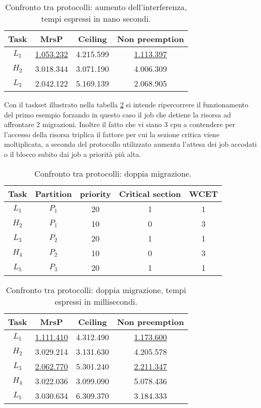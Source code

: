 \begin{table}
  \centering
  \begin{tabular}{cccc}
  \hline\hline
    Task & MrsP & Ceiling & Non preemption \\ \hline
    $L_1$ & \underline{1.053.232} & 4.215.599 & \underline{1.113.397} \\
    $H_2$ & 3.018.344 & 3.071.190 & 4.006.309 \\
    $L_3$ & 2.042.122 & 5.169.139 & 2.068.905 \\
    \hline
    \end{tabular}
    \caption{Confronto tra protocolli: aumento dell'interferenza, tempi espressi in nano secondi.}
  \label{tab:test_protocols_Taskset3_ris}
  \end{table}

\noindent Con il taskset illustrato nella tabella \ref{tab:test_protocols_Taskset4} si intende ripercorrere il funzionamento del primo esempio forzando in questo caso il job che detiene la risorsa ad affrontare 2 migrazioni. Inoltre il fatto che vi siano 3 cpu a contendere per l'accesso della risorsa triplica il fattore per cui la sezione critica viene moltiplicata, a seconda del protocollo utilizzato aumenta l'attesa dei job accodati o il blocco subito dai job a priorità più alta.\\

\begin{table}
  \centering
  \begin{tabular}{ccccc}
  \hline\hline
    Task & Partition     & priority & Critical section & WCET  \\ \hline
    $L_1$ & $P_1$  & 20 & 1 & 1 \\
    $H_2$ & $P_1$  & 10 & 0 & 3 \\
    $L_3$ & $P_2$  & 20 & 1 & 1 \\
    $H_4$ & $P_2$  & 10 & 0 & 3 \\
    $L_5$ & $P_3$  & 20 & 1 & 1 \\
    \hline
    \end{tabular}
    \caption{Confronto tra protocolli: doppia migrazione.}
  \label{tab:test_protocols_Taskset4}
  \end{table}

  \begin{table}
  \centering
  \begin{tabular}{cccc}
  \hline\hline
    Task & MrsP & Ceiling & Non preemption \\ \hline
    $L_1$ & \underline{1.111.410} & 4.312.490 & \underline{1.173.600} \\
    $H_2$ & 3.029.214 & 3.131.630 & 4.205.578 \\
    $L_3$ & \underline{2.062.770} & 5.301.240 & \underline{2.211.347} \\
    $H_4$ & 3.022.036 & 3.099.090 & 5.078.436 \\
    $L_5$ & 3.030.634 & 6.309.370 & 3.184.333 \\
    \hline
    \end{tabular}
    \caption{Confronto tra protocolli: doppia migrazione, tempi espressi in millisecondi.}
  \label{tab:test_protocols_Taskset4_ris}
  \end{table}

